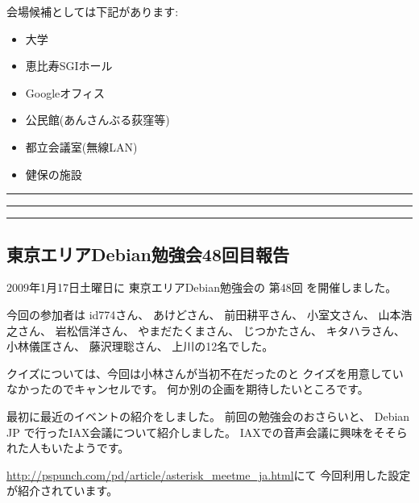 \documentclass[mingoth,a4paper]{jsarticle}
\begin{document}
\begin{multicols}{2}
 会場候補としては下記があります:

 \begin{itemize}
  \item 大学
  \item 恵比寿SGIホール
  \item Googleオフィス
  \item 公民館(あんさんぶる荻窪等)
  \item 都立会議室(無線LAN)
  \item 健保の施設
 \end{itemize}

\end{multicols}


\newpage

\begin{minipage}[b]{0.2\hsize}
 \colorbox{titleback}{}
\end{minipage}
\begin{minipage}[b]{0.8\hsize}
\hrule
\vspace{2mm}
\hrule
%
%
\setcounter{tocdepth}{1}
\tableofcontents
\vspace{2mm}
\hrule
\end{minipage}

\subsection{東京エリアDebian勉強会48回目報告}

2009年1月17日土曜日に
東京エリアDebian勉強会の
第48回
を開催しました。

今回の参加者は
id774さん、
あけどさん、
前田耕平さん、
小室文さん、
山本浩之さん、
岩松信洋さん、
やまだたくまさん、
じつかたさん、
キタハラさん、
小林儀匡さん、
藤沢理聡さん、
上川の12名でした。

クイズについては、今回は小林さんが当初不在だったのと
クイズを用意していなかったのでキャンセルです。
何か別の企画を期待したいところです。

最初に最近のイベントの紹介をしました。
前回の勉強会のおさらいと、
Debian JP で行ったIAX会議について紹介しました。
IAXでの音声会議に興味をそそられた人もいたようです。

\url{http://pspunch.com/pd/article/asterisk_meetme_ja.html}にて
今回利用した設定が紹介されています。
\end{document}
